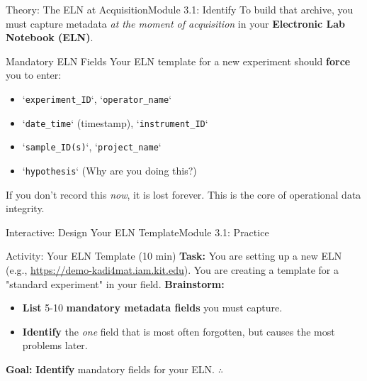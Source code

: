 \begin{frame}{Theory: The ELN at Acquisition}{Module 3.1: Identify}
    To build that archive, you must capture metadata \emph{at the moment of acquisition} in your \textbf{Electronic Lab Notebook (ELN)}.
    
        
        \begin{block}{Mandatory ELN Fields \cite{zb_med-informationszentrum_lebenswissenschaften_electronic_2021}}
            Your ELN template for a new experiment should \textbf{force} you to enter:
            \begin{itemize}
                \item `\texttt{experiment\_ID}`, `\texttt{operator\_name}`
                \item `\texttt{date\_time}` (timestamp), `\texttt{instrument\_ID}`
                \item `\texttt{sample\_ID(s)}`, `\texttt{project\_name}`
                \item `\texttt{hypothesis}` (Why are you doing this?)
            \end{itemize}
        \end{block}
    \pause
    If you don't record this \emph{now}, it is lost forever. This is the core of operational data integrity.
\end{frame}

\begin{frame}{Interactive: Design Your ELN Template}{Module 3.1: Practice}
    \begin{block}{Activity: Your ELN Template (10 min)}
        \textbf{Task:} You are setting up a new ELN (e.g., \href{https://demo-kadi4mat.iam.kit.edu}{https://demo-kadi4mat.iam.kit.edu}). You are creating a template for a "standard experiment" in your field.
        \pause
        \textbf{Brainstorm:}
        \begin{itemize}
            \item \textbf{List} 5-10 \textbf{mandatory metadata fields} you must capture.
            \item \textbf{Identify} the \textit{one} field that is most often forgotten, but causes the most problems later.
        \end{itemize}
        \pause
        \textbf{Goal:} \textbf{Identify} mandatory fields for your ELN.
        \href{https://demo-kadi4mat.iam.kit.edu/templates/8}{$\therefore$}
    \end{block}
\end{frame}

